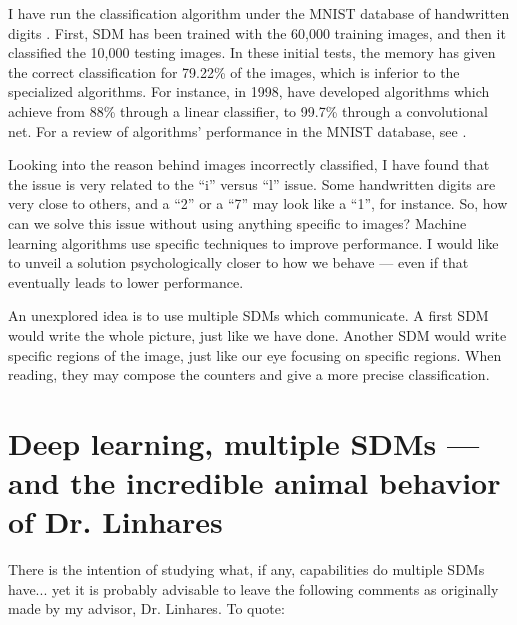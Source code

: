 I have run the classification algorithm under the MNIST database of handwritten digits \citep{deng2012mnist}. First, SDM has been trained with the 60,000 training images, and then it classified the 10,000 testing images. In these initial tests, the memory has given the correct classification for 79.22\% of the images, which is inferior to the specialized algorithms. For instance, in 1998, \citet{lecun1998gradient} have developed algorithms which achieve from 88\% through a linear classifier, to 99.7\% through a convolutional net. For a review of algorithms' performance in the MNIST database, see \cite{mnist}.

Looking into the reason behind images incorrectly classified, I have found that the issue is very related to the ``i'' versus ``l'' issue. Some handwritten digits are very close to others, and a ``2'' or a ``7'' may look like a ``1'', for instance. So, how can we solve this issue without using anything specific to images?  Machine learning algorithms use specific techniques to improve performance. I would like to unveil a solution psychologically closer to how we behave --- even if that eventually leads to lower performance.

An unexplored idea is to use multiple SDMs which communicate. A first SDM would write the whole picture, just like we have done. Another SDM would write specific regions of the image, just like our eye focusing on specific regions. When reading, they may compose the counters and give a more precise classification.



\section{Deep learning, multiple SDMs --- and the incredible animal behavior of Dr. Linhares}

There is the intention of studying what, if any, capabilities do multiple SDMs have...  yet it is probably advisable to leave the following comments as originally made by my advisor, Dr. Linhares. To quote:

